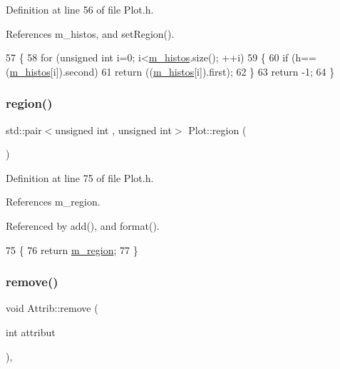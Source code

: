 Definition at line 56 of file Plot.\+h.



References m\+\_\+histos, and set\+Region().


\begin{DoxyCode}
57   \{
58     \textcolor{keywordflow}{for} (\textcolor{keywordtype}{unsigned} \textcolor{keywordtype}{int} i=0; i<\hyperlink{classPlot_a7edebf2b275223b8ce55f6ef3b2da0cc}{m\_histos}.size(); ++i)
59     \{
60       \textcolor{keywordflow}{if} (h==(\hyperlink{classPlot_a7edebf2b275223b8ce55f6ef3b2da0cc}{m\_histos}[i]).second)
61         \textcolor{keywordflow}{return} ((\hyperlink{classPlot_a7edebf2b275223b8ce55f6ef3b2da0cc}{m\_histos}[i]).first);
62     \}
63     \textcolor{keywordflow}{return} -1;
64   \}
\end{DoxyCode}
\mbox{\label{classPlot_ae493b21749049d75cbb7282b1e1b9ab4}} 
\subsubsection{\texorpdfstring{region()}{region()}}
{\footnotesize\ttfamily std\+::pair$<$unsigned int , unsigned int$>$ Plot\+::region (\begin{DoxyParamCaption}{ }\end{DoxyParamCaption})\hspace{0.3cm}{\ttfamily [inline]}}



Definition at line 75 of file Plot.\+h.



References m\+\_\+region.



Referenced by add(), and format().


\begin{DoxyCode}
75                                                 \{
76     \textcolor{keywordflow}{return} \hyperlink{classPlot_aabcbba1cfc66babcbcd647fdf90cdbf1}{m\_region};
77   \}
\end{DoxyCode}
\mbox{\label{classAttrib_a7d4ef7e32d93cb287792b87b857e79f3}} 
\subsubsection{\texorpdfstring{remove()}{remove()}}
{\footnotesize\ttfamily void Attrib\+::remove (\begin{DoxyParamCaption}\item[{int}]{attribut }\end{DoxyParamCaption})\hspace{0.3cm}{\ttfamily [inline]}, {\ttfamily [inherited]}}

